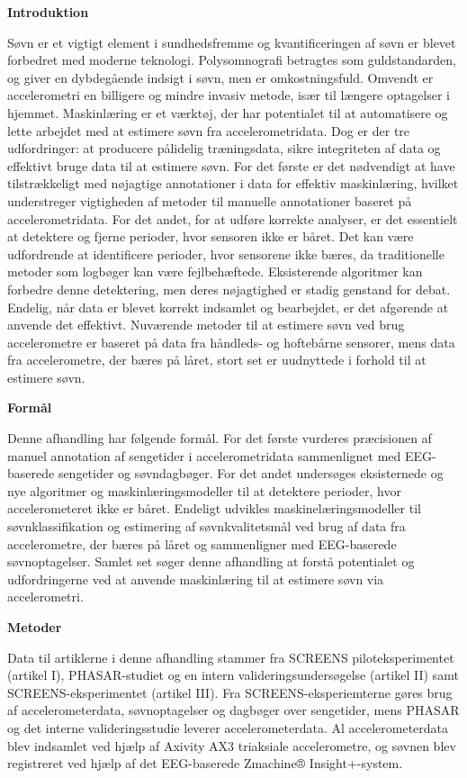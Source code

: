 \documentclass[
  10pt,
]{scrbook}
\begin{document}
\textbf{Introduktion}

Søvn er et vigtigt element i sundhedsfremme og kvantificeringen af søvn
er blevet forbedret med moderne teknologi. Polysomnografi betragtes som
guldstandarden, og giver en dybdegående indsigt i søvn, men er
omkostningsfuld. Omvendt er accelerometri en billigere og mindre invasiv
metode, især til længere optagelser i hjemmet. Maskinlæring er et
værktøj, der har potentialet til at automatisere og lette arbejdet med
at estimere søvn fra accelerometridata. Dog er der tre udfordringer: at
producere pålidelig træningsdata, sikre integriteten af data og
effektivt bruge data til at estimere søvn. For det første er det
nødvendigt at have tilstrækkeligt med nøjagtige annotationer i data for
effektiv maskinlæring, hvilket understreger vigtigheden af metoder til
manuelle annotationer baseret på accelerometridata. For det andet, for
at udføre korrekte analyser, er det essentielt at detektere og fjerne
perioder, hvor sensoren ikke er båret. Det kan være udfordrende at
identificere perioder, hvor sensorene ikke bæres, da traditionelle
metoder som logbøger kan være fejlbehæftede. Eksisterende algoritmer kan
forbedre denne detektering, men deres nøjagtighed er stadig genstand for
debat. Endelig, når data er blevet korrekt indsamlet og bearbejdet, er
det afgørende at anvende det effektivt. Nuværende metoder til at
estimere søvn ved brug accelerometre er baseret på data fra håndleds- og
hoftebårne sensorer, mens data fra accelerometre, der bæres på låret,
stort set er uudnyttede i forhold til at estimere søvn.

\textbf{Formål}

Denne afhandling har følgende formål. For det første vurderes
præcisionen af manuel annotation af sengetider i accelerometridata
sammenlignet med EEG-baserede sengetider og søvndagbøger. For det andet
undersøges eksisternede og nye algoritmer og maskinlæringsmodeller til
at detektere perioder, hvor accelerometeret ikke er båret. Endeligt
udvikles maskinelæringsmodeller til søvnklassifikation og estimering af
søvnkvalitetsmål ved brug af data fra accelerometre, der bæres på låret
og sammenligner med EEG-baserede søvnoptagelser. Samlet set søger denne
afhandling at forstå potentialet og udfordringerne ved at anvende
maskinlæring til at estimere søvn via accelerometri.

\textbf{Metoder}

Data til artiklerne i denne afhandling stammer fra SCREENS
piloteksperimentet (artikel I), PHASAR-studiet og en intern
valideringsundersøgelse (artikel II) samt SCREENS-eksperimentet (artikel
III). Fra SCREENS-eksperiemterne gøres brug af accelerometerdata,
søvnoptagelser og dagbøger over sengetider, mens PHASAR og det interne
valideringsstudie leverer accelerometerdata. Al accelerometerdata blev
indsamlet ved hjælp af Axivity AX3 triaksiale accelerometre, og søvnen
blev registreret ved hjælp af det EEG-baserede Zmachine®
Insight+-system.
\end{document}
